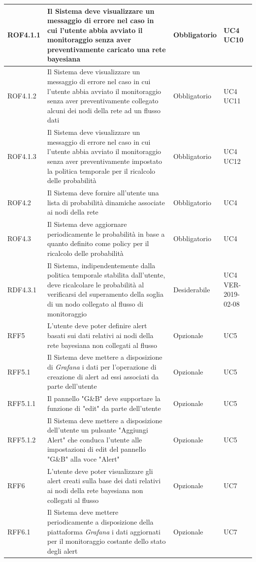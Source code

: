 \begin{center}
\begin{longtable}[c]{|m{}|m{}|m{}|m{}|}
\hline
ROF4.1.1 & Il Sistema deve visualizzare un messaggio di errore nel caso in cui l'utente abbia avviato il monitoraggio senza aver preventivamente caricato una rete bayesiana & Obbligatorio & UC4 UC10\\
\hline
\rowcolor{grigio}ROF4.1.2 & Il Sistema deve visualizzare un messaggio di errore nel caso in cui l'utente abbia avviato il monitoraggio senza aver preventivamente collegato alcuni dei nodi della rete ad un flusso dati & Obbligatorio & UC4 UC11\\
\hline
ROF4.1.3 & Il Sistema deve visualizzare un messaggio di errore nel caso in cui l'utente abbia avviato il monitoraggio senza aver preventivamente impostato la politica temporale per il ricalcolo delle probabilità & Obbligatorio & UC4 UC12\\
\hline
\rowcolor{grigio}ROF4.2 & Il Sistema deve fornire all'utente una lista di probabilità dinamiche associate ai nodi della rete & Obbligatorio & UC4\\
\hline
ROF4.3 & Il Sistema deve aggiornare periodicamente le probabilità in base a quanto definito come policy per il ricalcolo delle probabilità & Obbligatorio & UC4\\
\hline
\rowcolor{grigio}RDF4.3.1 & Il Sistema, indipendentemente dalla politica temporale stabilita dall'utente, deve ricalcolare le probabilità al verificarsi del superamento della soglia di un nodo collegato al flusso di monitoraggio & Desiderabile & UC4 VER-2019-02-08\\
\hline
RFF5 & L'utente deve poter definire alert basati sui dati relativi ai nodi della rete bayesiana non collegati al flusso & Opzionale & UC5\\
\hline
\rowcolor{grigio}RFF5.1 & Il Sistema deve mettere a disposizione di \textit{Grafana} i dati per l'operazione di creazione di alert ad essi associati da parte dell'utente & Opzionale & UC5\\
\hline
RFF5.1.1 & Il pannello "G\&B" deve supportare la funzione di "edit" da parte dell'utente & Opzionale & UC5\\
\hline
\rowcolor{grigio}RFF5.1.2 & Il Sistema deve mettere a disposizione dell'utente un pulsante "Aggiungi Alert" che conduca l'utente alle impostazioni di edit del pannello "G\&B" alla voce "Alert" & Opzionale & UC5\\
\hline
RFF6 & L'utente deve poter visualizzare gli alert creati sulla base dei dati relativi ai nodi della rete bayesiana non collegati al flusso & Opzionale & UC7\\ 
\hline
\rowcolor{grigio}RFF6.1 & Il Sistema deve mettere periodicamente a disposizione della piattaforma \textit{Grafana} i dati aggiornati per il monitoraggio costante dello stato degli alert & Opzionale & UC7\\

\end{longtable}
\end{center}

